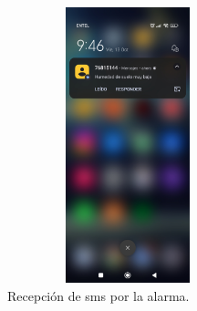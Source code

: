 \begin{figure}[htbp]
  \centering
    \includegraphics[width=7cm, height=8cm]{./Figures/sms_alarma.jpg}
  \caption{Recepción de sms por la alarma.}
    \label{fig:sms alarma}
\end{figure}

\label{sec:pruebasHW}

